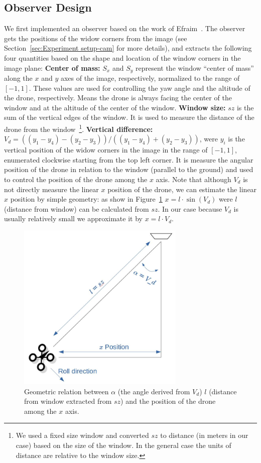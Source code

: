 \documentclass[ twoside, 12pt ]{article}
\begin{document}
\subsection{Observer Design}
\label{sec:Observer Design}
We first implemented an observer based on the work of Efraim~\cite{Efraim17}. The observer gets the positions of the widow corners from the image (see Section~\ref{sec:Experiment setup-cam} for more details), %
and extracts the following four quantities based on the shape and location of the window corners in the image plane: %
\textbf{Center of mass:} $S_x$ and $S_y$ represent the window ``center of mass'' along the $x$ and $y$ axes of the image, respectively, normalized to the range of $[-1,1]$.
These values are used for controlling the yaw angle and the altitude of the drone, respectively. Means the drone is always facing the center of the window and at the altitude of the center of the window. 
\textbf{Window size:} $sz$ is the sum of the vertical edges of the window. It is used to measure the distance of the drone from the window~\footnote{We used a fixed size window and converted $sz$ to distance (in meters in our case) based on the size of the window. In the general case the units of distance are relative to the window size.}.
\textbf{Vertical difference:} $V_d = {((y_1-y_4)-(y_2-y_3))}/{((y_1-y_4)+(y_2-y_3))}$, were $y_i$ is the vertical position of the widow corners in the image in the range of $[-1,1]$, enumerated clockwise starting from the top left corner. It is measure the angular position of the drone in relation to the window (parallel to the ground) and used to control the position of the drone among the $x$ axis.
Note that although $V_d$ is not directly measure the linear $x$ position of the drone, we can estimate the linear $x$ position by simple geometry:
as show in Figure~\ref{fig:V_d-geomerty} $x = l \cdot \sin (V_d)$ were $l$ (distance from window) can be calculated from $sz$. In our case because $V_d$ is usually relatively small we approximate it by $x = l \cdot V_d$.

\begin{figure} %
    \centerline{\includegraphics[width=80mm]{vd-geometry.jpg}}
    \caption{Geometric relation between $\alpha$ (the angle derived from $V_d$) $l$ (distance from window extracted from $sz$) and the position of the drone among the $x$ axis.}
    \label{fig:V_d-geomerty}
\end{figure}
\end{document}

